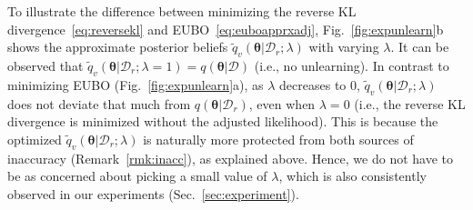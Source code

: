 \documentclass{article}
\theoremstyle{definition}
\newcommand{\mcl}[1]{\mathcal{#1}}
\newcommand{\da}{\mcl{D}}
\newcommand{\dc}{\mcl{D}_r}
\newcommand{\elbo}{\tilde{q}_v}
\begin{document}
To illustrate the difference between minimizing the reverse KL divergence~\eqref{eq:reversekl} and EUBO~\eqref{eq:euboapprxadj}, Fig.~\ref{fig:expunlearn}b shows the approximate  posterior beliefs $\elbo(\bm{\theta}|\dc; \lambda)$ with varying $\lambda$. It can be observed that $\elbo(\bm{\theta}|\dc; \lambda=1) = q(\bm{\theta}|\da)$ (i.e., no unlearning). In contrast to minimizing EUBO (Fig.~\ref{fig:expunlearn}a), as $\lambda$ decreases to $0$, $\elbo(\bm{\theta}|\dc; \lambda)$ does not deviate  that much from  $q(\bm{\theta}|\dc)$, even when $\lambda = 0$ (i.e.,  the reverse KL divergence is minimized without the adjusted likelihood). 
This is because
the optimized $\elbo(\bm{\theta}|\dc; \lambda)$ is naturally more protected from both sources of inaccuracy (Remark~\ref{rmk:inacc}), as explained above.
Hence, we do not have to be as concerned about picking a small value of $\lambda$, which is also consistently observed in our experiments  (Sec.~\ref{sec:experiment}).
%
\end{document}
